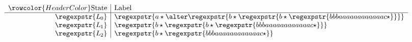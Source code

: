 $\begin{array}{r|l}\rowcolor{HeaderColor}\mathrm{State} & \mathrm{Label}\\\hline
\regexpstr{L_{\hspace*{-0.09ex}0}}&\regexpstr{a{}\hspace*{-0.09ex}\star \alter \regexpstr{b{}\hspace*{-0.09ex}\star \regexpstr{b{}\hspace*{-0.09ex}\star \regexpstr{bbbaaaaaaaaaaaac{}\hspace*{-0.09ex}\star }}}}\\
\regexpstr{L_{\hspace*{-0.09ex}1}}&\regexpstr{b{}\hspace*{-0.09ex}\star \regexpstr{b{}\hspace*{-0.09ex}\star \regexpstr{bbbaaaaaaaaaaaac{}\hspace*{-0.09ex}\star }}}\\
\regexpstr{L_{\hspace*{-0.09ex}2}}&\regexpstr{b{}\hspace*{-0.09ex}\star \regexpstr{bbbaaaaaaaaaaaac{}\hspace*{-0.09ex}\star }}\\
\end{array}$

